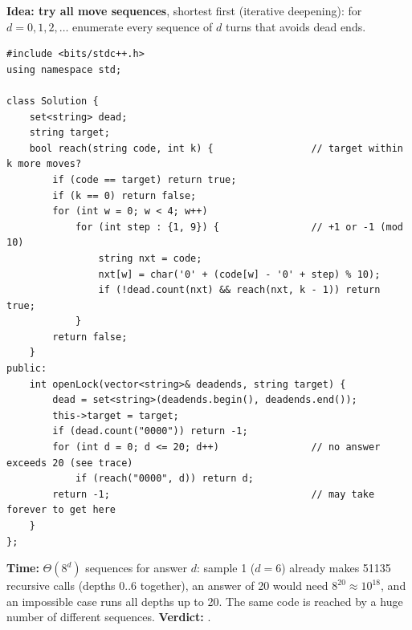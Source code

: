 \begin{bruteforcebox}
\textbf{Idea: try all move sequences}, shortest first (iterative deepening): for $d = 0, 1, 2, \dots$ enumerate every sequence of $d$ turns that avoids dead ends.

\begin{lstlisting}[style=cpp]
#include <bits/stdc++.h>
using namespace std;

class Solution {
    set<string> dead;
    string target;
    bool reach(string code, int k) {                 // target within k more moves?
        if (code == target) return true;
        if (k == 0) return false;
        for (int w = 0; w < 4; w++)
            for (int step : {1, 9}) {                // +1 or -1 (mod 10)
                string nxt = code;
                nxt[w] = char('0' + (code[w] - '0' + step) % 10);
                if (!dead.count(nxt) && reach(nxt, k - 1)) return true;
            }
        return false;
    }
public:
    int openLock(vector<string>& deadends, string target) {
        dead = set<string>(deadends.begin(), deadends.end());
        this->target = target;
        if (dead.count("0000")) return -1;
        for (int d = 0; d <= 20; d++)                // no answer exceeds 20 (see trace)
            if (reach("0000", d)) return d;
        return -1;                                   // may take forever to get here
    }
};
\end{lstlisting}

\begin{complexitybox}
\textbf{Time:} $\Theta(8^{d})$ sequences for answer $d$: sample 1 ($d=6$) already makes 51135 recursive calls (depths $0..6$ together), an answer of 20 would need $8^{20} \approx 10^{18}$, and an impossible case runs all depths up to 20. The same code is reached by a huge number of different sequences. \textbf{Verdict:} \tle{}.
\end{complexitybox}
\end{bruteforcebox}

